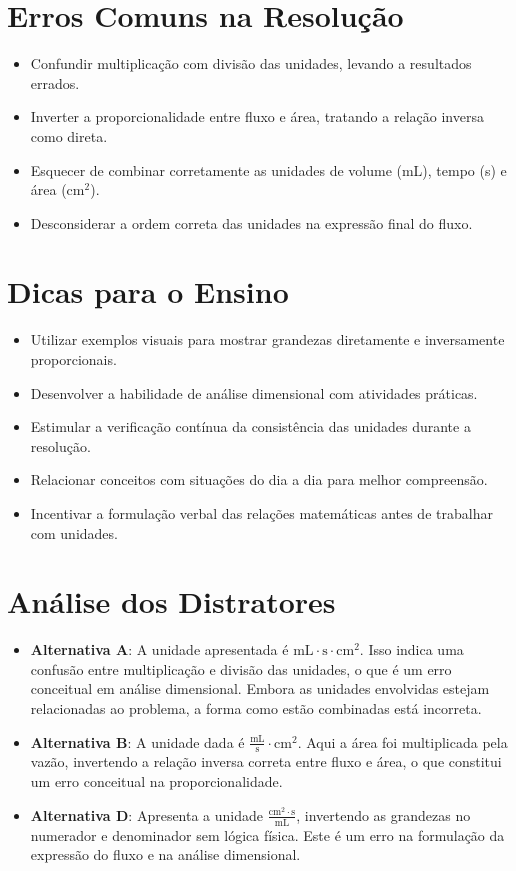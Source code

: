\documentclass{article}
\begin{document}
\section*{Erros Comuns na Resolução}
\begin{itemize}
  \item Confundir multiplicação com divisão das unidades, levando a resultados errados.
  \item Inverter a proporcionalidade entre fluxo e área, tratando a relação inversa como direta.
  \item Esquecer de combinar corretamente as unidades de volume (mL), tempo (s) e área (cm$^2$).
  \item Desconsiderar a ordem correta das unidades na expressão final do fluxo.
\end{itemize}

\section*{Dicas para o Ensino}
\begin{itemize}
  \item Utilizar exemplos visuais para mostrar grandezas diretamente e inversamente proporcionais.
  \item Desenvolver a habilidade de análise dimensional com atividades práticas.
  \item Estimular a verificação contínua da consistência das unidades durante a resolução.
  \item Relacionar conceitos com situações do dia a dia para melhor compreensão.
  \item Incentivar a formulação verbal das relações matemáticas antes de trabalhar com unidades.
\end{itemize}

\section{Análise dos Distratores}

\begin{itemize}
  \item \textbf{Alternativa A}: A unidade apresentada é $\mathrm{mL \cdot s \cdot cm^{2}}$. Isso indica uma confusão entre multiplicação e divisão das unidades, o que é um erro conceitual em análise dimensional. Embora as unidades envolvidas estejam relacionadas ao problema, a forma como estão combinadas está incorreta.

  \item \textbf{Alternativa B}: A unidade dada é $\mathrm{\frac{mL}{s} \cdot cm^{2}}$. Aqui a área foi multiplicada pela vazão, invertendo a relação inversa correta entre fluxo e área, o que constitui um erro conceitual na proporcionalidade.

  \item \textbf{Alternativa D}: Apresenta a unidade $\mathrm{\frac{cm^{2} \cdot s}{mL}}$, invertendo as grandezas no numerador e denominador sem lógica física. Este é um erro na formulação da expressão do fluxo e na análise dimensional.
\end{itemize}
\end{document}
